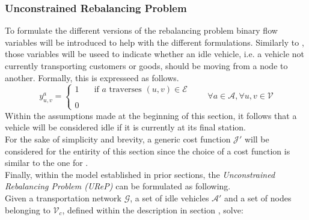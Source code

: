 \subsubsection*{Unconstrained Rebalancing Problem}
To formulate the different versions of the rebalancing problem binary flow variables will be introduced to help with the different formulations. Similarly to , those variables will be useed to indicate whether an idle vehicle, i.e. a vehicle not currently transporting customers or goods, should be moving from a node to another. Formally, this is expresseed as follows. 
\begin{equation*}
	y_{u,v}^a = 
	\begin{cases} 
		1 & \quad \text{if $a$ traverses } (u,v) \in \mathcal{E}\\
		\\
		0
	\end{cases}
	\quad\quad \forall a \in \mathcal{A}, \forall u,v \in \mathcal{V}
	\label{eq:binary_edges_reb}
\end{equation*}
Within the assumptions made at the beginning of this section, it follows that a vehicle will be considered idle if it is currently at its final station. \\
For the sake of simplicity and brevity, a generic cost function $\mathcal{J'}$ will be considered for the entirity of this section since the choice of a cost function is similar to the one for . \\
Finally, within the model established in prior sections, the \textit{Unconstrained Rebalancing Problem (UReP)} can be formulated as following. \\
Given a transportation network $\mathcal{G}$, a set of idle vehicles $\mathcal{A'}$ and a set of nodes belonging to $ \mathcal{V}_c$, defined within the description in section , solve:
